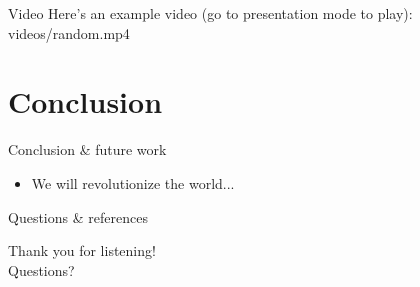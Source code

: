 \documentclass[10pt]{beamer}
\let\olditem\item
\renewcommand{\item}{\setlength{\itemsep}{\fill}\olditem}
\begin{document}

\begin{frame}{Video}
	Here's an example video (go to presentation mode to play):
        {videos/random.mp4}
\end{frame}

\section{Conclusion}

\begin{frame}{Conclusion \& future work}
	\begin{itemize}
		\item We will revolutionize the world...
	\end{itemize}
\end{frame}

\begin{frame}{Questions \& references}
	\begin{center}
		\LARGE
		Thank you for listening!\\ \vspace{10pt}Questions?
	\end{center}
	\fontsize{7pt}{8.4}\selectfont
	
	
\end{frame}
\end{document}
